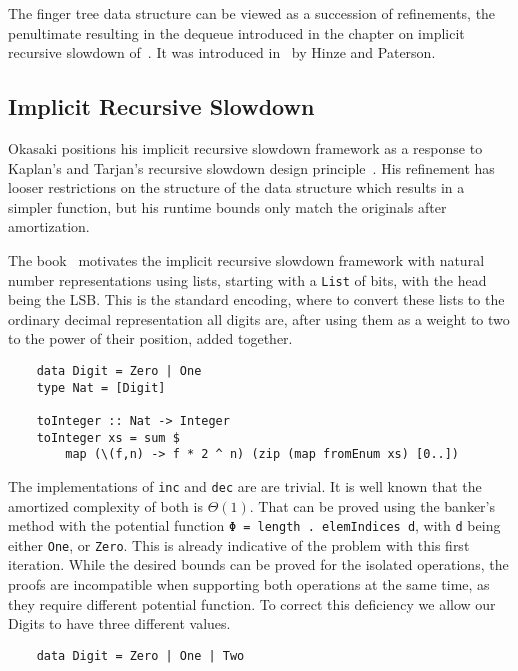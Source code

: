 The finger tree data structure can be viewed as a succession of refinements, the penultimate resulting in the dequeue introduced in the chapter on implicit recursive slowdown of~\cite{okasaki1999purely}. It was introduced in~\cite{hinze_paterson_2006} by Hinze and Paterson.

\subsection{Implicit Recursive Slowdown}

Okasaki positions his implicit recursive slowdown framework as a response to Kaplan's and Tarjan's recursive slowdown design principle~\cite{Kaplan:1995:PLC:225058.225090}. His refinement has looser restrictions on the structure of the data structure which results in a simpler function, but his runtime bounds only match the originals after amortization.\par
The book~\cite{okasaki1999purely} motivates the  implicit recursive slowdown framework with natural number representations using lists, starting with a \texttt{List} of bits, with the head being the LSB\@. This is the standard encoding, where to convert these lists to the ordinary decimal representation all digits are, after using them as a weight to two to the power of their position, added together.
\begin{verbatim}
    data Digit = Zero | One
    type Nat = [Digit]

    toInteger :: Nat -> Integer
    toInteger xs = sum $
        map (\(f,n) -> f * 2 ^ n) (zip (map fromEnum xs) [0..])
\end{verbatim}
The implementations of \texttt{inc} and \texttt{dec} are are trivial. It is well known that the amortized complexity of both is \(\Theta(1)\). That can be proved using the banker's method with the potential function \texttt{Φ = length . elemIndices d}, with \texttt{d} being either \texttt{One}, or \texttt{Zero}. This is already indicative of the problem with this first iteration. While the desired bounds can be proved for the isolated operations, the proofs are incompatible when supporting both operations at the same time, as they require different potential function. To correct this deficiency we allow our Digits to have three different values.
\begin{verbatim}
    data Digit = Zero | One | Two
\end{verbatim}
